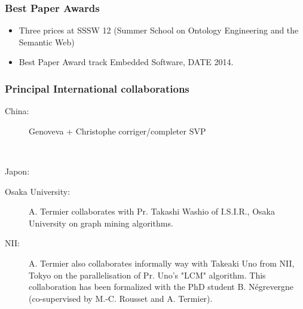 \subsubsection*{Best Paper Awards}
\begin{itemize}

\item Three prices at SSSW 12 (Summer School on Ontology Engineering and the Semantic Web) 

\item Best Paper Award track Embedded Software, DATE 2014.



\end{itemize}

\subsubsection{Principal International collaborations}

\begin{description}

\item[China:] Genoveva + Christophe corriger/completer SVP

\ \\

\item[Japon:] 

\end{description}

\begin{description}

\item[Osaka University:] 
A. Termier collaborates with Pr. Takashi Washio of I.S.I.R., Osaka University on graph mining algorithms. 
\item[NII:] 
A. Termier also collaborates informally way with Takeaki Uno from NII, Tokyo on the parallelisation of Pr. Uno's "LCM" algorithm.
This collaboration has been formalized with the PhD student B.  N{\'e}grevergne (co-supervised by M.-C. Rousset and A. Termier). 

\end{description}

